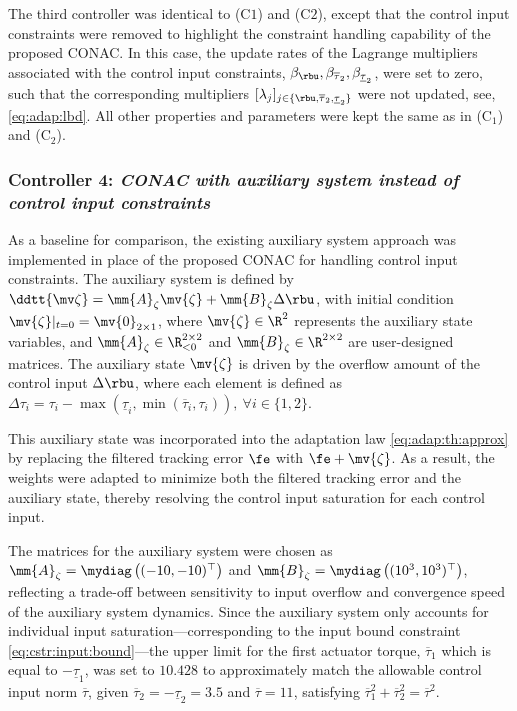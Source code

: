 \documentclass[journal]{IEEEtran}
\begin{document}
The third controller was identical to (C$1$) and (C$2$), except that the control input constraints were removed to highlight the constraint handling capability of the proposed CONAC.
In this case, the update rates of the Lagrange multipliers associated with the control input constraints, \ie $\beta_{\rbu},\beta_{\overline{\tau}_2},\beta_{\underline{\tau}_2}$, were set to zero, such that the corresponding multipliers $[\lambda_j]_{j\in\{\rbu,\overline{\tau}_2,\underline{\tau}_2\}}$ were not updated, see, \eqref{eq:adap:lbd}.
All other properties and parameters were kept the same as in (C$_1$) and (C$_2$).

\subsubsection*{Controller 4:  \textit{CONAC with auxiliary system instead of control input constraints}}

As a baseline for comparison, the existing auxiliary system approach \cite{Esfandiari:2014aa, Karason:1994aa, Esfandiari:2015aa} was implemented in place of the proposed CONAC for handling control input constraints.
The auxiliary system is defined by $\ddtt{\mv\zeta} = \mm{A}_\zeta \mv{\zeta} + \mm{B}_\zeta \Delta\rbu$, with initial condition $\mv{\zeta}\vert_{t=0} = \mv{0}_{2\times1}$, where $\mv{\zeta}\in\R^2$ represents the auxiliary state variables, and $\mm{A}_\zeta\in\R_{<0}^{2\times 2}$ and $\mm{B}_\zeta\in\R^{2\times 2}$ are user-designed matrices.
The auxiliary state $\mv{\zeta}$ is driven by the overflow amount of the control input $\Delta\rbu$, where each element is defined as $\Delta\tau_{i} = \tau_{i}-\max(\underline\tau_i,\min(\overline\tau_i,\tau_i)),\ \forall i\in\{1,2\}$.

This auxiliary state was incorporated into the adaptation law \eqref{eq:adap:th:approx} by replacing the filtered tracking error $\fe$ with $\fe+\mv{\zeta}$.
As a result, the weights were adapted to minimize both the filtered tracking error and the auxiliary state, thereby resolving the control input saturation for each control input.

The matrices for the auxiliary system were chosen as $\mm{A}_\zeta=\mydiag\left((-10,-10)^\top\right)$ and $\mm{B}_\zeta=\mydiag\left((10^3,10^3)^\top\right)$, reflecting a trade-off between sensitivity to input overflow and convergence speed of the auxiliary system dynamics.
Since the auxiliary system only accounts for individual input saturation—corresponding to the input bound constraint \eqref{eq:cstr:input:bound}—the upper limit for the first actuator torque, $\overline{\tau}_1$ which is equal to $-\underline{\tau}_1$, was set to $10.428$ to approximately match the allowable control input norm $\overline{\tau}$, given $\overline{\tau}_2=-\underline{\tau}_2 = 3.5$ and $\overline{\tau} = 11$, satisfying $\overline{\tau}_1^2 + \overline{\tau}_2^2 = \overline{\tau}^2$.
\end{document}
